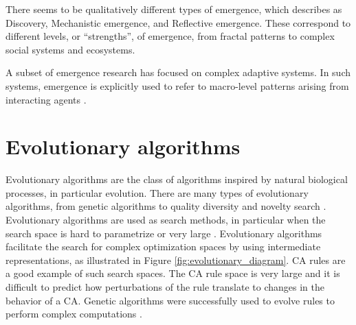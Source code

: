 There seems to be qualitatively different types of emergence, which
\textcite{dehaanHowEmergenceArises2006} describes as Discovery, Mechanistic
emergence, and Reflective emergence. These correspond to different levels, or
``strengths'', of emergence, from fractal patterns to complex social systems and
ecosystems.

A subset of emergence research has focused on complex adaptive systems. In
such systems, emergence is explicitly used to refer to macro-level patterns
arising from interacting agents \parencite{hollandEmergenceChaosOrder2000,
  kauffmanHomeUniverseSearch1995, langtonStudyingArtificialLife1986}.


\section{Evolutionary algorithms}\label{sec:evol-algor}
Evolutionary algorithms are the class of algorithms inspired by natural
biological processes, in particular evolution. There are many types of
evolutionary algorithms, from genetic algorithms to quality diversity and
novelty search \parencite{lehmanAbandoningObjectivesEvolution2011,
  lehmanEvolvingDiversityVirtual2011}. Evolutionary algorithms are used as
search methods, in particular when the search space is hard to parametrize or
very large \parencite{poliRelationsSearchEvolutionary1996}. Evolutionary
algorithms facilitate the search for complex optimization spaces by using intermediate
representations, as illustrated in Figure \ref{fig:evolutionary_diagram}.
\ac{CA} rules are a good example of such search spaces. The \ac{CA} rule space is
very large and it is difficult to predict how perturbations of the rule
translate to changes in the behavior of a \ac{CA}. Genetic algorithms were
successfully used to evolve rules to perform complex computations
\parencite{mitchellEvolvingCellularAutomata1996}.


